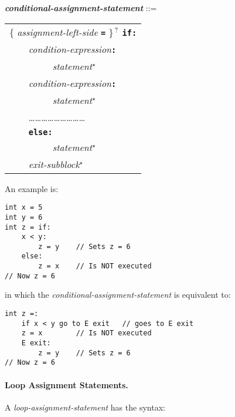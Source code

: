 \documentclass[12pt]{article}
\newcommand{\subsubsubsection}[1]{\paragraph[#1]{#1.}}
\newcommand{\TT}[1]{{\tt \bfseries #1}}
\newcommand{\STAR}{{\Large $^\star$}}
\newcommand{\QMARK}{{$^{\,\mbox{\footnotesize ?}}$}}
\newcommand{\ttkey}[1]{{\tt \bfseries #1}}
\newcommand{\emkey}[1]{{\em \bfseries #1}}
\newenvironment{indpar}[1][0.3in]%
	{\begin{list}{}%
		     {\setlength{\itemsep}{0in}%
		      \setlength{\topsep}{0in}%
		      \setlength{\parsep}{1ex}%
		      \setlength{\labelwidth}{#1}%
		      \setlength{\leftmargin}{#1}%
		      \addtolength{\leftmargin}{\labelsep}}%
	 \item}%
	{\end{list}}
\begin{document}
\begin{indpar}
\emkey{conditional-assignment-statement} ::= \\
\hspace*{0.5in}\begin{tabular}[t]{l}
        \{ {\em assignment-left-side} \TT{=} \}\QMARK{} \ttkey{if}\TT{:} \\
	\TT{~~~~}{\em condition-expression}\TT{:} \\
	\TT{~~~~~~~~~}{\em statement}\STAR{} \\
	\TT{~~~~}{\em condition-expression}\TT{:} \\
	\TT{~~~~~~~~~}{\em statement}\STAR{} \\
	\TT{~~~~}\ldots\ldots\ldots\ldots\ldots\ldots\ldots\ldots\ldots \\
	\TT{~~~~}\ttkey{else}\TT{:} \\
	\TT{~~~~~~~~~}{\em statement}\STAR{} \\
	\TT{~~~~}{\em exit-subblock}\STAR{}
	\end{tabular}
\end{indpar}

An example is:
\begin{indpar}\begin{verbatim}
int x = 5
int y = 6
int z = if:
    x < y:
        z = y    // Sets z = 6
    else:
        z = x    // Is NOT executed
// Now z = 6
\end{verbatim}\end{indpar}
in which the {\em conditional-assignment-statement} is equivalent to:
\begin{indpar}\begin{verbatim}
int z =:
    if x < y go to E exit   // goes to E exit
    z = x        // Is NOT executed
    E exit:
        z = y    // Sets z = 6
// Now z = 6
\end{verbatim}\end{indpar}

\subsubsubsection{Loop Assignment Statements}
\label{LOOP-ASSIGNMENT-STATEMENTS}

A {\em loop-assignment-statement} has the syntax:
\end{document}

